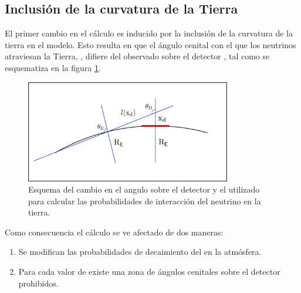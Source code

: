 	\subsection{Inclusi\'on de la curvatura de la Tierra}
	El primer cambio en el c\'alculo es inducido por la inclusi\'on de la curvatura de la tierra en el modelo. 
	Esto resulta en que el \'angulo cenital con el que los neutrinos atraviesan la Tierra, \te{}, difiere del observado sobre el detector \td{}, tal como se esquematiza en la figura \ref{fig:curveEarthSketch0}.
	 \begin{figure}[ht!]
		\centering
		\includegraphics[width=0.8\textwidth]{./fig/appendix/curveEarthSketch.pdf}
		\caption{\label{fig:curveEarthSketch0}
		Esquema del cambio en el angulo sobre el detector y el utilizado para calcular las probabilidades de interacci\'on del neutrino en la tierra.
		}
	\end{figure}
	Como consecuencia el c\'alculo se ve afectado de dos maneras:
	\begin{enumerate}
	 \item Se modifican las probabilidades de decaimiento del \tauon{} en la atm\'osfera.
	 \item Para cada valor de \xd{} existe una zona de \'angulos cenitales sobre el detector prohibidos.
	\end{enumerate}
	
